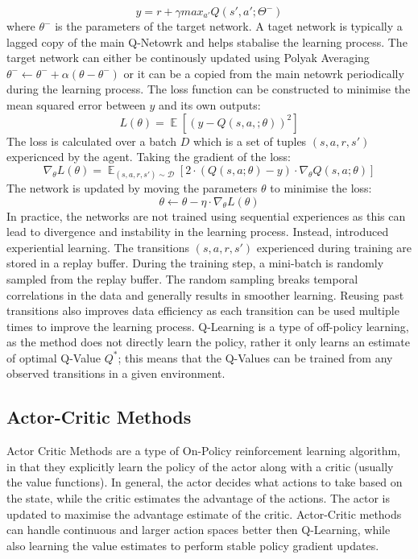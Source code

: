\documentclass[12pt,a4paper]{report}
\DeclareMathOperator{\EX}{\mathbb{E}}
\begin{document}
\[
  y = r + \gamma max_{a'} Q(s', a'; \Theta^-)
\]
where $\theta^-$ is the parameters of the target network. A taget network is typically a lagged copy of the main Q-Netowrk and helps stabalise the learning process. The target network can either be continously updated using Polyak Averaging $\theta^- \leftarrow \theta^-+ \alpha (\theta - \theta^-)$ or it can be a copied from the main netowrk periodically during the learning process. 
The loss function can be constructed to minimise the mean squared error between $y$ and its own outputs: 
\[
  L(\theta) = \EX[(y - Q(s, a, ; \theta))^2]
\] 
The loss is calculated over a batch $D$ which is a set of tuples $(s, a, r, s')$ expericnced by the agent. Taking the gradient of the loss:
\[
\nabla_{\theta} L(\theta) = \EX_{(s, a, r, s') \sim \mathcal{D}} [ 2 \cdot \left( Q(s, a; \theta) - y \right) \cdot \nabla_{\theta} Q(s, a; \theta) ]
\]
The network is updated by moving the parameters $\theta$ to minimise the loss:
\[
  \theta \leftarrow \theta - \eta \cdot \nabla_{\theta} L(\theta)
\] 
In practice, the networks are not trained using sequential experiences as this can lead to divergence and instability in the learning process. Instead, \cite{Mnih2015} introduced experiential learning. The transitions $(s, a, r, s')$ experienced during training are stored in a replay buffer. During the training step, a mini-batch is randomly sampled from the replay buffer. The random sampling breaks temporal correlations in the data and generally results in smoother learning. Reusing past transitions also improves data efficiency as each transition can be used multiple times to improve the learning process. Q-Learning is a type of off-policy learning, as the method does not directly learn the policy, rather it only learns an estimate of optimal Q-Value $Q^*$; this means that the Q-Values can be trained from any observed transitions in a given environment. 

\subsection{Actor-Critic Methods}
Actor Critic Methods are a type of On-Policy reinforcement learning algorithm, in that they explicitly learn the policy of the actor along with a critic (usually the value functions). In general, the actor decides what actions to take based on the state, while the critic estimates the advantage of the actions. The actor is updated to maximise the advantage estimate of the critic. Actor-Critic methods can handle continuous and larger action spaces better then Q-Learning, while also learning the value estimates to perform stable policy gradient updates. \par 
 
\end{document}
